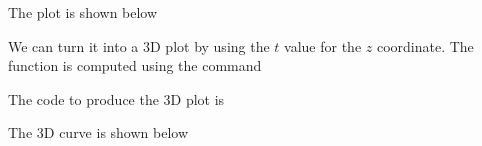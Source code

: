 
The plot is shown below



\bigskip


We can turn it into a 3D plot by using the $t$ value for the $z$ coordinate. 
The 
function is computed using the command 


The code to produce the 3D plot is


The 3D curve is shown below

